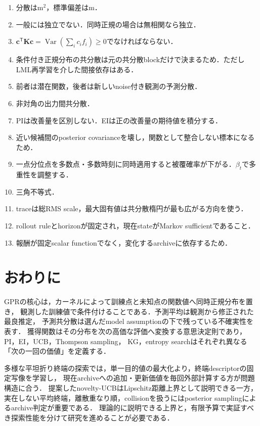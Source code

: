 \documentclass[a4paper,11pt]{ltjsarticle}
\newcommand{\T}{\mathsf T}
\newcommand{\Var}{\operatorname{Var}}
\begin{document}
\begin{enumerate}
  \item 分散は\(\mathrm{m}^2\)，標準偏差はm．
  \item 一般には独立でない．同時正規の場合は無相関なら独立．
  \item \(\bm c^\T\bm K\bm c=\Var(\sum_i c_if_i)\geq0\)でなければならない．
  \item 条件付き正規分布の共分散は元の共分散blockだけで決まるため．ただしLML再学習を介した間接依存はある．
  \item 前者は潜在関数，後者は新しいnoise付き観測の予測分散．
  \item 非対角の出力間共分散．
  \item PIは改善量を区別しない．EIは正の改善量の期待値を積分する．
  \item 近い候補間のposterior covarianceを壊し，関数として整合しない標本になるため．
  \item 一点分位点を多数点・多数時刻に同時適用すると被覆確率が下がる．\(\beta_t\)で多重性を調整する．
  \item 三角不等式．
  \item traceは総RMS scale，最大固有値は共分散楕円が最も広がる方向を使う．
  \item rollout ruleとhorizonが固定され，現在stateがMarkov sufficientであること．
  \item 報酬が固定scalar functionでなく，変化するarchiveに依存するため．
\end{enumerate}

\section{おわりに}

GPRの核心は，カーネルによって訓練点と未知点の関数値へ同時正規分布を置き，
観測した訓練値で条件付けることである．予測平均は観測から修正された最良推定，
予測共分散は選んだmodel assumptionの下で残っている不確実性を表す．
獲得関数はその分布を次の高価な評価へ変換する意思決定則であり，PI，EI，UCB，Thompson sampling，
KG，entropy searchはそれぞれ異なる「次の一回の価値」を定義する．

多様な平坦折り終端の探索では，単一目的値の最大化より，終端descriptorの固定写像を学習し，
現在archiveへの追加・更新価値を毎回外部計算する方が問題構造に合う．
提案したnovelty-UCBはLipschitz距離上界として説明できる一方，
実在しない平均終端，離散重なり順，collisionを扱うにはposterior samplingによるarchive判定が重要である．
理論的に説明できる上界と，有限予算で実証すべき探索性能を分けて研究を進めることが必要である．

\begingroup
\small
\setlength{\bibsep}{0.15\baselineskip}


\endgroup
\end{document}
